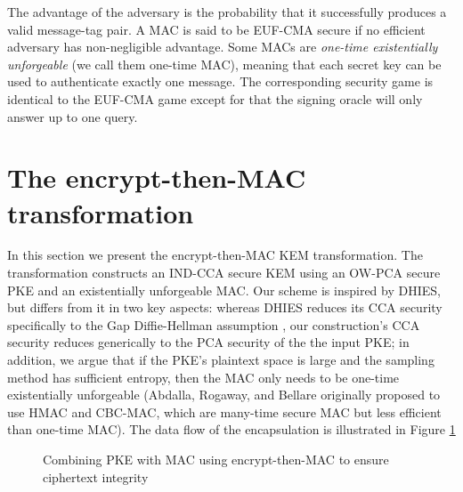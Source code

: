 \documentclass[runningheads]{llncs}
\newcommand{\mac}{\texttt{MAC}}
\newcommand{\pk}{\texttt{pk}}
\newcommand{\leftsample}{\stackrel{\$}{\leftarrow}}
\begin{document}
The advantage of the adversary is the probability that it successfully produces a valid message-tag pair. A MAC is said to be EUF-CMA secure if no efficient adversary has non-negligible advantage. Some MACs are \textit{one-time existentially unforgeable} (we call them one-time MAC), meaning that each secret key can be used to authenticate exactly one message. The corresponding security game is identical to the EUF-CMA game except for that the signing oracle will only answer up to one query.

\section{The encrypt-then-MAC transformation}\label{sec:the-enc-then-mac-transformation}
In this section we present the encrypt-then-MAC KEM transformation. The transformation constructs an IND-CCA secure KEM using an OW-PCA secure PKE and an existentially unforgeable MAC. Our scheme is inspired by DHIES, but differs from it in two key aspects: whereas DHIES reduces its CCA security specifically to the Gap Diffie-Hellman assumption \cite{DBLP:conf/pkc/OkamotoP01}, our construction's CCA security reduces generically to the PCA security of the the input PKE; in addition, we argue that if the PKE's plaintext space is large and the sampling method has sufficient entropy, then the MAC only needs to be one-time existentially unforgeable (Abdalla, Rogaway, and Bellare originally proposed to use HMAC and CBC-MAC, which are many-time secure MAC but less efficient than one-time MAC). The data flow of the encapsulation is illustrated in Figure \ref{fig:etm-encap-data-flow}

\begin{figure}[h]
    \centering

    \caption{Combining PKE with MAC using encrypt-then-MAC to ensure ciphertext integrity}\label{fig:etm-encap-data-flow}
\end{figure}
\end{document}
